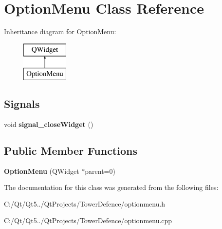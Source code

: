 \hypertarget{class_option_menu}{}\section{Option\+Menu Class Reference}
\label{class_option_menu}
Inheritance diagram for Option\+Menu\+:\begin{figure}[H]
\begin{center}
\leavevmode
\includegraphics[height=2.000000cm]{class_option_menu}
\end{center}
\end{figure}
\subsection*{Signals}
\begin{DoxyCompactItemize}
\item 
\hypertarget{class_option_menu_a870f0ac36e86d88b9c1cf058d22cf976}{}void {\bfseries signal\+\_\+close\+Widget} ()\label{class_option_menu_a870f0ac36e86d88b9c1cf058d22cf976}

\end{DoxyCompactItemize}
\subsection*{Public Member Functions}
\begin{DoxyCompactItemize}
\item 
\hypertarget{class_option_menu_a8a3ff5aa83973a1066db381d1064d43d}{}{\bfseries Option\+Menu} (Q\+Widget $\ast$parent=0)\label{class_option_menu_a8a3ff5aa83973a1066db381d1064d43d}

\end{DoxyCompactItemize}


The documentation for this class was generated from the following files\+:\begin{DoxyCompactItemize}
\item 
C\+:/\+Qt/\+Qt5../\+Qt\+Projects/\+Tower\+Defence/optionmenu.\+h\item 
C\+:/\+Qt/\+Qt5../\+Qt\+Projects/\+Tower\+Defence/optionmenu.\+cpp\end{DoxyCompactItemize}
